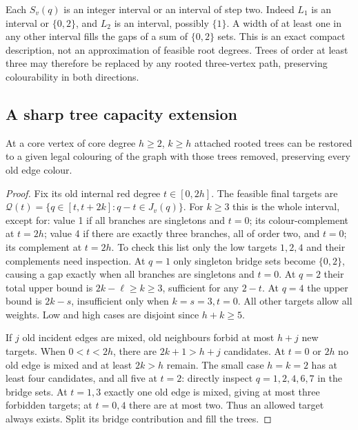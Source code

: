 Each $S_v(q)$ is an integer interval or an interval of step two.
Indeed $L_1$ is an interval or $\{0,2\}$, and $L_2$ is an interval,
possibly $\{1\}$. A width of at least one in any other interval
fills the gaps of a sum of $\{0,2\}$ sets. This is an exact compact
description, not an approximation of feasible root degrees. Trees
of order at least three may therefore be replaced by any rooted
three-vertex path, preserving colourability in both directions.

\subsection{A sharp tree capacity extension}\label{sec:treecapacity}

\begin{theorem}\label{thm:treecapacity}
At a core vertex of core degree $h\ge2$, $k\ge h$ attached rooted
trees can be restored to a given legal colouring of the graph with
those trees removed, preserving every old edge colour.
\end{theorem}
\begin{proof}
Fix its old internal red degree $t\in[0,2h]$. The feasible final
targets are $\mathcal Q(t)=\{q\in[t,t+2k]:q-t\in J_v(q)\}$.
For $k\ge3$ this is the whole interval, except for: value 1 if all
branches are singletons and $t=0$; its colour-complement at $t=2h$;
value 4 if there are exactly three branches, all of order two, and
$t=0$; its complement at $t=2h$. To check this list only the low
targets $1,2,4$ and their complements need inspection. At $q=1$
only singleton bridge sets become $\{0,2\}$, causing a gap exactly
when all branches are singletons and $t=0$. At $q=2$ their total
upper bound is $2k-\ell\ge k\ge3$, sufficient for any $2-t$.
At $q=4$ the upper bound is $2k-s$, insufficient only when
$k=s=3,t=0$. All other targets allow all weights. Low and high
cases are disjoint since $h+k\ge5$.

If $j$ old incident edges are mixed, old neighbours forbid at most
$h+j$ new targets. When $0<t<2h$, there are $2k+1>h+j$ candidates.
At $t=0$ or $2h$ no old edge is mixed and at least $2k>h$ remain.
The small case $h=k=2$ has at least four candidates, and all five
at $t=2$: directly inspect $q=1,2,4,6,7$ in the bridge sets.
At $t=1,3$ exactly one old edge is mixed, giving at most three
forbidden targets; at $t=0,4$ there are at most two. Thus an allowed
target always exists. Split its bridge contribution and fill the trees.
\end{proof}

